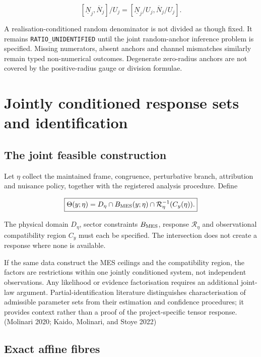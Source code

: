\documentclass[
  11pt,
  a4paper]{article}
\begin{document}
\[
[\underline N_j,\overline N_j]/U_j
=[\underline N_j/U_j,\overline N_j/U_j].
\]

A realisation-conditioned random denominator is not divided as though fixed. It remains \texttt{RATIO\_UNIDENTIFIED} until the joint random-anchor inference problem is specified. Missing numerators, absent anchors and channel mismatches similarly remain typed non-numerical outcomes. Degenerate zero-radius anchors are not covered by the positive-radius gauge or division formulae.

\hypertarget{jointly-conditioned-response-sets-and-identification}{%
\section{Jointly conditioned response sets and identification}\label{jointly-conditioned-response-sets-and-identification}}

\hypertarget{the-joint-feasible-construction}{%
\subsection{The joint feasible construction}\label{the-joint-feasible-construction}}

Let \(\eta\) collect the maintained frame, congruence, perturbative branch, attribution and nuisance policy, together with the registered analysis procedure. Define

\[
\boxed{
\Theta(y;\eta)
=D_\eta\cap B_{\rm MES}(y;\eta)
\cap\mathcal R_\eta^{-1}(C_y(\eta)).
}
\]

The physical domain \(D_\eta\), sector constraints \(B_{\rm MES}\), response \(\mathcal R_\eta\) and observational compatibility region \(C_y\) must each be specified. The intersection does not create a response where none is available.

If the same data construct the MES ceilings and the compatibility region, the factors are restrictions within one jointly conditioned system, not independent observations. Any likelihood or evidence factorisation requires an additional joint-law argument. Partial-identification literature distinguishes characterisation of admissible parameter sets from their estimation and confidence procedures; it provides context rather than a proof of the project-specific tensor response. (Molinari 2020; Kaido, Molinari, and Stoye 2022)

\hypertarget{exact-affine-fibres}{%
\subsection{Exact affine fibres}\label{exact-affine-fibres}}
\end{document}

